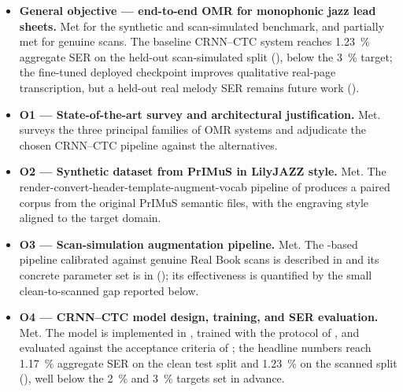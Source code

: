 \begin{itemize}
    \item \textbf{General objective — end-to-end OMR for monophonic jazz
          lead sheets.}
          Met for the synthetic and scan-simulated benchmark, and
          partially met for genuine scans.
          The baseline CRNN--CTC system reaches \SI{1.23}{\percent}
          aggregate SER on the held-out scan-simulated split
          (), below the
          \SI{3}{\percent} target; the fine-tuned deployed checkpoint
          improves qualitative real-page transcription, but a held-out
          real melody SER remains future work
          ().
    \item \textbf{O1 — State-of-the-art survey and architectural
          justification.}
          Met.
           surveys the three principal families of OMR
          systems and 
          adjudicate the chosen CRNN--CTC pipeline against the alternatives.
    \item \textbf{O2 — Synthetic dataset from PrIMuS in LilyJAZZ style.}
          Met.
          The render-convert-header-template-augment-vocab pipeline of
           produces a paired
           corpus from the original PrIMuS
          semantic files, with the engraving style aligned to the
          target domain.
    \item \textbf{O3 — Scan-simulation augmentation pipeline.}
          Met.
          The -based pipeline calibrated against
          genuine Real Book scans is described in 
          and its concrete parameter set is in 
          (); its effectiveness is quantified by
          the small clean-to-scanned gap reported below.
    \item \textbf{O4 — CRNN--CTC model design, training, and SER
          evaluation.}
          Met.
          The model is implemented in , trained
          with the protocol of , and
          evaluated against the acceptance criteria of
          ; the headline numbers reach
          \SI{1.17}{\percent} aggregate SER on the clean test split and
          \SI{1.23}{\percent} on the scanned split
          (), well below the
          \SI{2}{\percent} and \SI{3}{\percent} targets set in advance.

\end{itemize}
